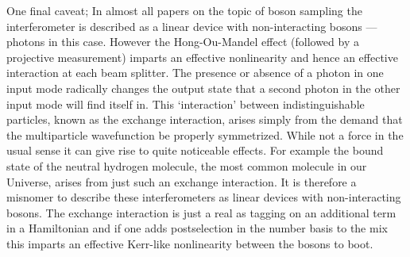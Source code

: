 \documentclass[aps,pra,twocolumn,amsmath,amssymb,nofootinbib,superscriptaddress]{revtex4}
\begin{document}
	One final caveat; In almost all papers on the topic of boson sampling the interferometer is described as a linear device with non-interacting bosons — photons in this case. However the Hong-Ou-Mandel effect (followed by a projective measurement) imparts an effective nonlinearity and hence an effective interaction at each beam splitter. The presence or absence of a photon in one input mode radically changes the output state that a second photon in the other input mode will find itself in. This ‘interaction’ between indistinguishable particles, known as the exchange interaction, arises simply from the demand that the multiparticle wavefunction be properly symmetrized. While not a force in the usual sense it can give rise to quite noticeable effects. For example the bound state of the neutral hydrogen molecule, the most common molecule in our Universe, arises from just such an exchange interaction. It is therefore a misnomer to describe these interferometers as linear devices with non-interacting bosons. The exchange interaction is just a real as tagging on an additional term in a Hamiltonian and if one adds postselection in the number basis to the mix this imparts an effective Kerr-like nonlinearity between the bosons to boot.   
\end{document}
